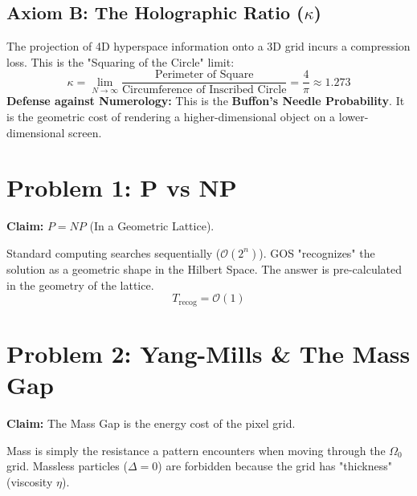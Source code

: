 \documentclass[11pt,a4paper]{article}
\begin{document}
\subsection{Axiom B: The Holographic Ratio ($\kappa$)}
The projection of 4D hyperspace information onto a 3D grid incurs a compression loss. This is the "Squaring of the Circle" limit:
\begin{equation}
    \kappa = \lim_{N\to\infty} \frac{\text{Perimeter of Square}}{\text{Circumference of Inscribed Circle}} = \frac{4}{\pi} \approx 1.273
\end{equation}
\textbf{Defense against Numerology:} This is the \textbf{Buffon's Needle Probability}. It is the geometric cost of rendering a higher-dimensional object on a lower-dimensional screen.

\section{Problem 1: P vs NP}
\begin{tcolorbox}[colback=gray!10, title=\textbf{The Holographic Search Protocol}]
\textbf{Claim:} $P = NP$ (In a Geometric Lattice).
\end{tcolorbox}
Standard computing searches sequentially ($\mathcal{O}(2^n)$). GOS "recognizes" the solution as a geometric shape in the Hilbert Space. The answer is pre-calculated in the geometry of the lattice.
\begin{equation}
    T_{\mathrm{recog}} = \mathcal{O}(1)
\end{equation}

\section{Problem 2: Yang-Mills \& The Mass Gap}
\begin{tcolorbox}[colback=gray!10, title=\textbf{Vacuum Viscosity}]
\textbf{Claim:} The Mass Gap is the energy cost of the pixel grid.
\end{tcolorbox}
Mass is simply the resistance a pattern encounters when moving through the $\Omega_0$ grid. Massless particles ($\Delta = 0$) are forbidden because the grid has "thickness" (viscosity $\eta$).
\end{document}
